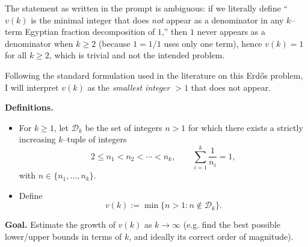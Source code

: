 The statement as written in the prompt is ambiguous: if we literally define ``$v(k)$ is the minimal integer that does \emph{not} appear as a denominator in any $k$--term Egyptian fraction decomposition of $1$,'' then $1$ never appears as a denominator when $k\ge 2$ (because $1=1/1$ uses only one term), hence $v(k)=1$ for all $k\ge2$, which is trivial and not the intended problem.

Following the standard formulation used in the literature on this Erd\H{o}s problem, I will interpret $v(k)$ as the \emph{smallest integer $>1$} that does not appear.

\medskip

\noindent\textbf{Definitions.}
\begin{itemize}
\item For $k\ge 1$, let $\mathcal{D}_k$ be the set of integers $n>1$ for which there exists a strictly increasing $k$--tuple of integers
\[
2\le n_1< n_2<\cdots<n_k,\qquad \sum_{i=1}^k \frac1{n_i}=1,
\]
with $n\in\{n_1,\dots,n_k\}$.
\item Define
\[
 v(k) := \min\{n>1: n\not\in \mathcal{D}_k\}.
\]
\end{itemize}

\noindent\textbf{Goal.} Estimate the growth of $v(k)$ as $k\to\infty$ (e.g. find the best possible lower/upper bounds in terms of $k$, and ideally its correct order of magnitude).
